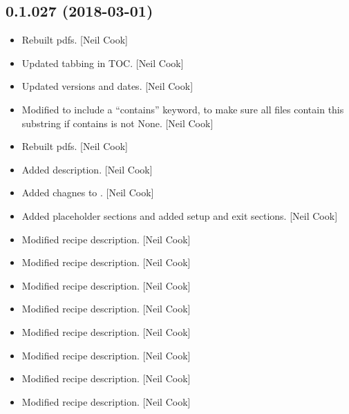\documentclass[a4paper,10pt,english]{report}
\begin{document}
\subsection{0.1.027 (2018-03-01)}
\label{\detokenize{misc/changelog:id477}}\begin{itemize}
\item {} 
Rebuilt pdfs. {[}Neil Cook{]}

\item {} 
Updated tabbing in TOC. {[}Neil Cook{]}

\item {} 
Updated versions and dates. {[}Neil Cook{]}

\item {} 
Modified  to include a “contains” keyword, to make
sure all files  contain this substring if contains is
not None. {[}Neil Cook{]}

\item {} 
Rebuilt pdfs. {[}Neil Cook{]}

\item {} 
Added description. {[}Neil Cook{]}

\item {} 
Added chagnes to . {[}Neil Cook{]}

\item {} 
Added placeholder sections and added setup and exit sections. {[}Neil
Cook{]}

\item {} 
Modified recipe description. {[}Neil Cook{]}

\item {} 
Modified recipe description. {[}Neil Cook{]}

\item {} 
Modified recipe description. {[}Neil Cook{]}

\item {} 
Modified recipe description. {[}Neil Cook{]}

\item {} 
Modified recipe description. {[}Neil Cook{]}

\item {} 
Modified recipe description. {[}Neil Cook{]}

\item {} 
Modified recipe description. {[}Neil Cook{]}

\item {} 
Modified recipe description. {[}Neil Cook{]}


\end{itemize}
\end{document}
